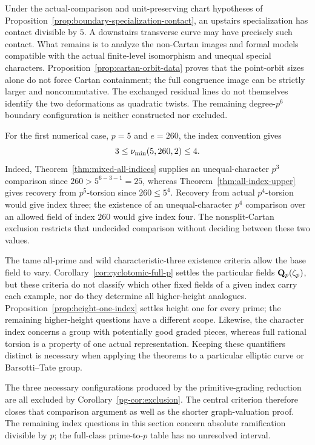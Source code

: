 Under the actual-comparison and unit-preserving chart hypotheses of Proposition~\ref{prop:boundary-specialization-contact}, an upstairs specialization has contact divisible by $5$. A downstairs transverse curve may have precisely such contact. What remains is to analyze the non-Cartan images and formal models compatible with the actual finite-level isomorphism and unequal special characters. Proposition~\ref{prop:cartan-orbit-data} proves that the point-orbit sizes alone do not force Cartan containment; the full congruence image can be strictly larger and noncommutative. The exchanged residual lines do not themselves identify the two deformations as quadratic twists. The remaining degree-$p^6$ boundary configuration is neither constructed nor excluded.

For the first numerical case, $p=5$ and $e=260$, the index convention gives
\[
                         3\le\nu_{\min}(5,260,2)\le4.
\]
Indeed, Theorem~\ref{thm:mixed-all-indices} supplies an unequal-character
$p^3$ comparison since $260>5^{6-3-1}=25$, whereas
Theorem~\ref{thm:all-index-upper} gives recovery from $p^5$-torsion
since $260\le5^4$. Recovery from actual $p^4$-torsion would give
index three; the existence of an unequal-character $p^4$ comparison
over an allowed field of index $260$ would give index four.
The nonsplit-Cartan exclusion restricts that undecided comparison
without deciding between these two values.

The tame all-prime and wild characteristic-three existence criteria allow the base field to vary. Corollary~\ref{cor:cyclotomic-full-p} settles the particular fields $\mathbf Q_p(\zeta_p)$, but these criteria do not classify which other fixed fields of a given index carry each example, nor do they determine all higher-height analogues. Proposition~\ref{prop:height-one-index} settles height one for every prime; the remaining higher-height questions have a different scope. Likewise, the character index concerns a group with potentially good graded pieces, whereas full rational torsion is a property of one actual representation. Keeping these quantifiers distinct is necessary when applying the theorems to a particular elliptic curve or Barsotti--Tate group.


The three necessary configurations produced by the primitive-grading reduction are all excluded by Corollary~\ref{pg-cor:exclusion}. The central criterion therefore closes that comparison argument as well as the shorter graph-valuation proof. The remaining index questions in this section concern absolute ramification divisible by $p$; the full-class prime-to-$p$ table has no unresolved interval.
